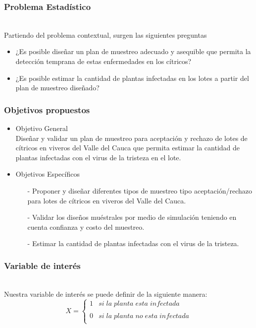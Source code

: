 \documentclass[11pt]{beamer}
\begin{document}
\begin{frame}
\frametitle{Problema Estadístico}
~\\Partiendo del problema contextual, surgen las siguientes preguntas
\begin{itemize}
\item ¿Es posible diseñar un plan de muestreo adecuado y asequible que permita la detección temprana de estas enfermedades en los cítricos?
\item ¿Es posible estimar la cantidad de plantas infectadas en los lotes a partir del plan de muestreo diseñado?
\end{itemize}
\end{frame}

\begin{frame}
\frametitle{Objetivos propuestos}
\begin{itemize}
\item Objetivo General
~\\Diseñar y validar un plan de muestreo para aceptación y rechazo de lotes de cítricos en viveros del Valle del Cauca que permita estimar la cantidad de plantas infectadas con el virus de la tristeza en el lote.
\item Objetivos Específicos
\begin{itemize}
\item[-]Proponer y diseñar diferentes tipos de muestreo tipo aceptación/rechazo para lotes de cítricos en viveros del Valle del Cauca.
\item[-]Validar los diseños muéstrales por medio de simulación teniendo en cuenta confianza y costo del muestreo.
\item[-]Estimar la cantidad de plantas infectadas con el virus de la tristeza.
\end{itemize}
\end{itemize}
\end{frame}

\begin{frame}
\frametitle{Variable de interés}
~\\Nuestra variable de interés se puede definir de la siguiente manera:
$$X= \left\{\begin{array}{cc}
             1 &   si \; la \; planta \; esta \; infectada \\
             \\ 0 &  si \; la \; planta \; no \; esta \; infectada \\
             \end{array}
   \right.$$
\end{frame}
\end{document}
